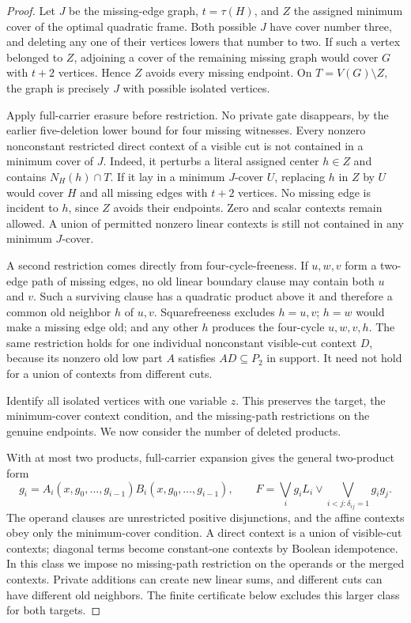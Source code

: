 \begin{proof}
Let $J$ be the missing-edge graph, $t=\tau(H)$, and $Z$ the assigned minimum cover of the optimal quadratic frame. Both possible $J$ have cover number three, and deleting any one of their vertices lowers that number to two. If such a vertex belonged to $Z$, adjoining a cover of the remaining missing graph would cover $G$ with $t+2$ vertices. Hence $Z$ avoids every missing endpoint. On $T=V(G)\setminus Z$, the graph is precisely $J$ with possible isolated vertices.

Apply full-carrier erasure before restriction. No private gate disappears, by the earlier five-deletion lower bound for four missing witnesses. Every nonzero nonconstant restricted direct context of a visible cut is not contained in a minimum cover of $J$. Indeed, it perturbs a literal assigned center $h\in Z$ and contains $N_H(h)\cap T$. If it lay in a minimum $J$-cover $U$, replacing $h$ in $Z$ by $U$ would cover $H$ and all missing edges with $t+2$ vertices. No missing edge is incident to $h$, since $Z$ avoids their endpoints. Zero and scalar contexts remain allowed. A union of permitted nonzero linear contexts is still not contained in any minimum $J$-cover.

A second restriction comes directly from four-cycle-freeness. If $u,w,v$ form a two-edge path of missing edges, no old linear boundary clause may contain both $u$ and $v$. Such a surviving clause has a quadratic product above it and therefore a common old neighbor $h$ of $u,v$. Squarefreeness excludes $h=u,v$; $h=w$ would make a missing edge old; and any other $h$ produces the four-cycle $u,w,v,h$. The same restriction holds for one individual nonconstant visible-cut context $D$, because its nonzero old low part $A$ satisfies $AD\subseteq P_2$ in support. It need not hold for a union of contexts from different cuts.

Identify all isolated vertices with one variable $z$. This preserves the target, the minimum-cover context condition, and the missing-path restrictions on the genuine endpoints. We now consider the number of deleted products.

With at most two products, full-carrier expansion gives the general two-product form
\[
 g_i=A_i(x,g_0,\ldots,g_{i-1})B_i(x,g_0,\ldots,g_{i-1}),\qquad
 F=\bigvee_i g_iL_i\vee\!\bigvee_{i<j:\delta_{ij}=1}g_ig_j.
\]
The operand clauses are unrestricted positive disjunctions, and the affine contexts obey only the minimum-cover condition. A direct context is a union of visible-cut contexts; diagonal terms become constant-one contexts by Boolean idempotence. In this class we impose no missing-path restriction on the operands or the merged contexts. Private additions can create new linear sums, and different cuts can have different old neighbors. The finite certificate below excludes this larger class for both targets.


\end{proof}
